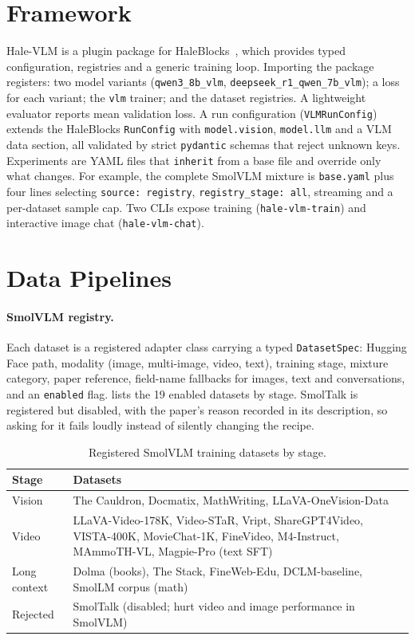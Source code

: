 \documentclass[11pt]{article}
\begin{document}
\section{Framework}
\label{sec:framework}

Hale-VLM is a plugin package for HaleBlocks~\cite{haleblocks}, which provides typed
configuration, registries and a generic training loop. Importing the package registers:
two model variants (\texttt{qwen3\_8b\_vlm}, \texttt{deepseek\_r1\_qwen\_7b\_vlm}); a loss for each
variant; the \texttt{vlm} trainer; and the dataset registries. A lightweight evaluator reports mean validation loss. A run
configuration (\texttt{VLMRunConfig}) extends the HaleBlocks \texttt{RunConfig} with
\texttt{model.vision}, \texttt{model.llm} and a VLM data section, all validated by strict
\texttt{pydantic} schemas that reject unknown keys. Experiments are YAML files that
\texttt{inherit} from a base file and override only what changes. For example, the complete
SmolVLM mixture is \texttt{base.yaml} plus four lines selecting \texttt{source: registry},
\texttt{registry\_stage: all}, streaming and a per-dataset sample cap. Two CLIs expose
training (\texttt{hale-vlm-train}) and interactive image chat (\texttt{hale-vlm-chat}).

\section{Data Pipelines}
\label{sec:data}

\paragraph{SmolVLM registry.} Each dataset is a registered adapter class carrying a typed
\texttt{DatasetSpec}: Hugging Face path, modality (image, multi-image, video, text),
training stage, mixture category, paper reference, field-name fallbacks for images, text
and conversations, and an \texttt{enabled} flag.  lists the 19 enabled
datasets by stage. SmolTalk is registered but disabled, with the paper's reason recorded
in its description, so asking for it fails loudly instead of silently changing the recipe.

\begin{table}[t]
\centering
\caption{Registered SmolVLM training datasets by stage.}
\label{tab:data}
\small
\begin{tabular}{lp{11.2cm}}
\toprule
Stage & Datasets \\
\midrule
Vision & The Cauldron, Docmatix, MathWriting, LLaVA-OneVision-Data \\
Video & LLaVA-Video-178K, Video-STaR, Vript, ShareGPT4Video, VISTA-400K, MovieChat-1K, FineVideo, M4-Instruct, MAmmoTH-VL, Magpie-Pro (text SFT) \\
Long context & Dolma (books), The Stack, FineWeb-Edu, DCLM-baseline, SmolLM corpus (math) \\
Rejected & SmolTalk (disabled; hurt video and image performance in SmolVLM) \\
\bottomrule
\end{tabular}
\end{table}
\end{document}
